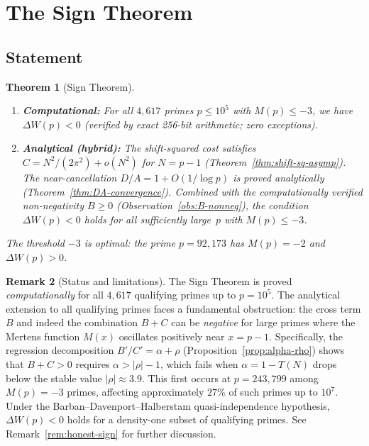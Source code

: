 \documentclass[11pt]{article}
\newtheorem{theorem}{Theorem}[section]
\theoremstyle{definition}
\newtheorem{remark}[theorem]{Remark}
\begin{document}
\section{The Sign Theorem}\label{sec:sign}

\subsection{Statement}\label{sec:sign-statement}

\begin{theorem}[Sign Theorem]\label{thm:sign}
\begin{enumerate}[\upshape(a)]
  \item \textbf{Computational:} For all $4{,}617$ primes
    $p \le 10^5$ with $M(p) \le -3$, we have $\Delta W(p) < 0$
    (verified by exact 256-bit arithmetic; zero exceptions).
  \item \textbf{Analytical (hybrid):} The shift-squared cost satisfies
    $C = N^2/(2\pi^2) + o(N^2)$ for $N = p - 1$
    (Theorem~\ref{thm:shift-sq-asymp}).  The near-cancellation
    $D/A = 1 + O(1/\log p)$ is proved analytically
    (Theorem~\ref{thm:DA-convergence}).  Combined with the
    computationally verified non-negativity $B \ge 0$
    (Observation~\ref{obs:B-nonneg}), the condition
    $\Delta W(p) < 0$ holds for all sufficiently large~$p$ with
    $M(p) \le -3$.
\end{enumerate}
The threshold $-3$ is optimal: the prime $p = 92{,}173$
has $M(p) = -2$ and $\Delta W(p) > 0$.
\end{theorem}

\begin{remark}[Status and limitations]\label{rem:sign-status}
The Sign Theorem is proved \emph{computationally} for all
$4{,}617$ qualifying primes up to $p = 10^5$.
The analytical extension to all qualifying primes faces a
fundamental obstruction: the cross term $B$ and indeed the
combination $B + C$ can be \emph{negative} for large primes
where the Mertens function $M(x)$ oscillates positively near
$x = p - 1$.  Specifically, the regression decomposition
$B'/C' = \alpha + \rho$ (Proposition~\ref{prop:alpha-rho})
shows that $B + C > 0$ requires $\alpha > |\rho| - 1$,
which fails when $\alpha = 1 - T(N)$ drops below the stable
value $|\rho| \approx 3.9$.  This first occurs at
$p = 243{,}799$ among $M(p) = -3$ primes, affecting
approximately $27\%$ of such primes up to $10^7$.
Under the Barban--Davenport--Halberstam quasi-independence
hypothesis, $\Delta W(p) < 0$ holds for a density-one
subset of qualifying primes.
See Remark~\ref{rem:honest-sign} for further discussion.
\end{remark}
\end{document}
